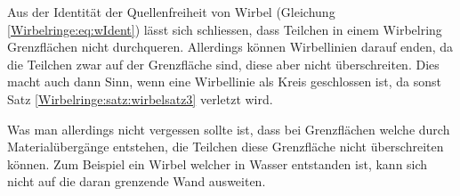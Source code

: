Aus der Identität der Quellenfreiheit von Wirbel (Gleichung \eqref{Wirbelringe:eq:wIdent}) lässt sich schliessen, dass Teilchen in einem Wirbelring Grenzflächen nicht durchqueren.
Allerdings können Wirbellinien darauf enden, da die Teilchen zwar auf der Grenzfläche sind, diese aber nicht überschreiten.
Dies macht auch dann Sinn, wenn eine Wirbellinie als Kreis geschlossen ist, da sonst Satz \ref{Wirbelringe:satz:wirbelsatz3} verletzt wird.

Was man allerdings nicht vergessen sollte ist, dass bei Grenzflächen welche durch Materialübergänge entstehen, die Teilchen diese Grenzfläche nicht überschreiten können.
Zum Beispiel ein Wirbel welcher in Wasser entstanden ist, kann sich nicht auf die daran grenzende Wand ausweiten.
